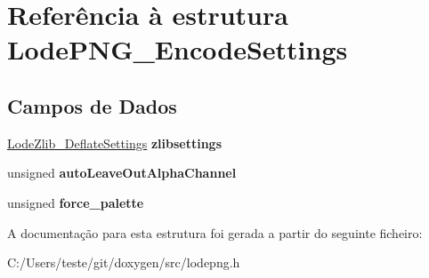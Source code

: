 \hypertarget{struct_lode_p_n_g___encode_settings}{\section{Referência à estrutura Lode\-P\-N\-G\-\_\-\-Encode\-Settings}
\label{struct_lode_p_n_g___encode_settings}
}
\subsection*{Campos de Dados}
\begin{DoxyCompactItemize}
\item 
\hypertarget{struct_lode_p_n_g___encode_settings_ac308c49bd30070b3917a4f0ce6ae385c}{\hyperlink{struct_lode_zlib___deflate_settings}{Lode\-Zlib\-\_\-\-Deflate\-Settings} {\bfseries zlibsettings}}\label{struct_lode_p_n_g___encode_settings_ac308c49bd30070b3917a4f0ce6ae385c}

\item 
\hypertarget{struct_lode_p_n_g___encode_settings_ae8d055143456abfa987a9d51f4b8b091}{unsigned {\bfseries auto\-Leave\-Out\-Alpha\-Channel}}\label{struct_lode_p_n_g___encode_settings_ae8d055143456abfa987a9d51f4b8b091}

\item 
\hypertarget{struct_lode_p_n_g___encode_settings_a0c2622313692f415ee26f02879da56c6}{unsigned {\bfseries force\-\_\-palette}}\label{struct_lode_p_n_g___encode_settings_a0c2622313692f415ee26f02879da56c6}

\end{DoxyCompactItemize}


A documentação para esta estrutura foi gerada a partir do seguinte ficheiro\-:\begin{DoxyCompactItemize}
\item 
C\-:/\-Users/teste/git/doxygen/src/lodepng.\-h\end{DoxyCompactItemize}
